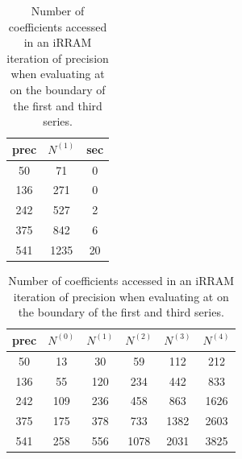 		\begin{table}[h]
			 \centering
			\begin{subtable}{0.48\textwidth}
				\centering
			  	\begin{tabular}{|c|c|c|}
			  	\hline
			  	prec & $N^{(1)}$ & sec \\
			  	\hline
			  	50 & 71 & 0\\
			  	\hline
			  	136 & 271 & 0\\
			  	\hline
			  	242 & 527 & 2\\
			  	\hline
			  	375 & 842 & 6\\
			  	\hline
			  	541 & 1235 & 20\\
			  	\hline
			  	\end{tabular}
			  	\caption{evaluating at series 1}
		  	\end{subtable}
			\begin{subtable}{0.48\textwidth}
				\centering
			  	\begin{tabular}{|c|c|c|c|c|c|}
			  	\hline
			  	prec & $N^{(0)}$ & $N^{(1)}$ &$N^{(2)}$ & $N^{(3)}$ & $N^{(4)}$ \\
			  	\hline
			  	50 & 13 & 30 & 59 & 112 & 212\\
			  	\hline
			  	136 & 55 & 120 & 234 & 442 & 833\\
			  	\hline
			  	242 & 109 & 236 & 458 & 863 & 1626\\
			  	\hline
			  	375 & 175 & 378 & 733 & 1382 & 2603\\
			  	\hline
			  	541 & 258 & 556 & 1078 & 2031 & 3825\\
			  	\hline
			  	\end{tabular}
			  	\caption{evaluating at series 3}
		  	\end{subtable}
			\caption{Number of coefficients accessed in an iRRAM iteration of precision \sprec when evaluating at on the boundary of the first and third series.}
			\label{fig:xinv coeff 0 dep on n}
		\end{table}

